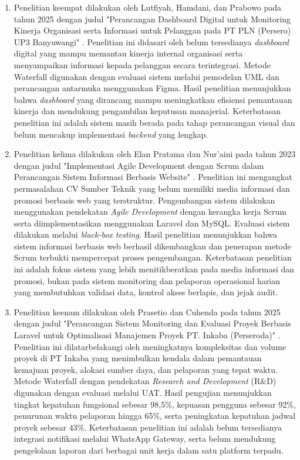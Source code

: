 \begin{enumerate}[noitemsep]
    \item Penelitian keempat dilakukan oleh Lutfiyah, Hamdani, dan Prabowo pada tahun 2025 dengan judul "Perancangan Dashboard Digital untuk Monitoring Kinerja Organisasi serta Informasi untuk Pelanggan pada PT PLN (Persero) UP3 Banyuwangi" \cite{lutfiyah2025dashboard}. Penelitian ini didasari oleh belum tersedianya \textit{dashboard} digital yang mampu memantau kinerja internal organisasi serta menyampaikan informasi kepada pelanggan secara terintegrasi. Metode Waterfall digunakan dengan evaluasi sistem melalui pemodelan UML dan perancangan antarmuka menggunakan Figma. Hasil penelitian menunjukkan bahwa \textit{dashboard} yang dirancang mampu meningkatkan efisiensi pemantauan kinerja dan mendukung pengambilan keputusan manajerial. Keterbatasan penelitian ini adalah sistem masih berada pada tahap perancangan visual dan belum mencakup implementasi \textit{backend} yang lengkap.

    \item Penelitian kelima dilakukan oleh Elan Pratama dan Nur'aini pada tahun 2023 dengan judul "Implementasi Agile Development dengan Scrum dalam Perancangan Sistem Informasi Berbasis Website" \cite{pratama2023scrum}. Penelitian ini mengangkat permasalahan CV Sumber Teknik yang belum memiliki media informasi dan promosi berbasis web yang terstruktur. Pengembangan sistem dilakukan menggunakan pendekatan \textit{Agile Development} dengan kerangka kerja Scrum serta diimplementasikan menggunakan Laravel dan MySQL. Evaluasi sistem dilakukan melalui \textit{black-box testing}. Hasil penelitian menunjukkan bahwa sistem informasi berbasis web berhasil dikembangkan dan penerapan metode Scrum terbukti mempercepat proses pengembangan. Keterbatasan penelitian ini adalah fokus sistem yang lebih menitikberatkan pada media informasi dan promosi, bukan pada sistem monitoring dan pelaporan operasional harian yang membutuhkan validasi data, kontrol akses berlapis, dan jejak audit.

    \item Penelitian keenam dilakukan oleh Prasetio dan Cuhenda pada tahun 2025 dengan judul "Perancangan Sistem Monitoring dan Evaluasi Proyek Berbasis Laravel untuk Optimalisasi Manajemen Proyek PT. Inkaba (Perseroda)" \cite{nugroho2025monitoring}. Penelitian ini dilatarbelakangi oleh meningkatnya kompleksitas dan volume proyek di PT Inkaba yang menimbulkan kendala dalam pemantauan kemajuan proyek, alokasi sumber daya, dan pelaporan yang tepat waktu. Metode Waterfall dengan pendekatan \textit{Research and Development} (R\&D) digunakan dengan evaluasi melalui UAT. Hasil pengujian menunjukkan tingkat kepatuhan fungsional sebesar 98,5\%, kepuasan pengguna sebesar 92\%, penurunan waktu pelaporan hingga 65\%, serta peningkatan kepatuhan jadwal proyek sebesar 43\%. Keterbatasan penelitian ini adalah belum tersedianya integrasi notifikasi melalui WhatsApp Gateway, serta belum mendukung pengelolaan laporan dari berbagai unit kerja dalam satu platform terpadu.
\end{enumerate}


